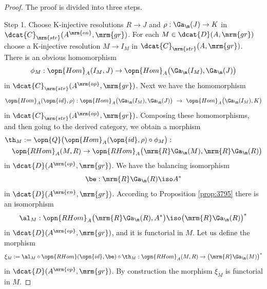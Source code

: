 \begin{proof} 
The proof is divided into three steps. 

\smallskip \noindent 
Step 1. Choose K-injective resolutions $R \to J$ and
$\rho : \Ga_{\m}(J) \to K$ in $\dcat{C}_{\mrm{str}}(A^{\mrm{en}}, \mrm{gr})$.
For each $M \in \dcat{D}(A, \mrm{gr})$ choose a K-injective resolution 
$M \to I_M$ in $\dcat{C}_{\mrm{str}}(A, \mrm{gr})$. 
There is an obvious homomorphism 
\[ \phi_M : \opn{Hom}_A(I_M, J) \to 
\opn{Hom}_A \bigl( \Ga_{\m}(I_M), \Ga_{\m}(J) \bigr)  \] 
in $\dcat{C}_{\mrm{str}}(A^{\mrm{op}}, \mrm{gr})$. 
Next we have the homomorphism 
\[ \opn{Hom}_A(\opn{id}, \rho) :  
\opn{Hom}_A \bigl( \Ga_{\m}(I_M), \Ga_{\m}(J) \bigr) \ \to \ 
\opn{Hom}_A \bigl( \Ga_{\m}(I_M), K \bigr) \] 
in $\dcat{C}_{\mrm{str}}(A^{\mrm{op}}, \mrm{gr})$. 
Composing these homomorphisms, and then going to the derived category, we 
obtain a morphism 
\begin{equation} \label{eqn:4835}
\begin{aligned}
& 
\th_M := \opn{Q} \bigl( \opn{Hom}_A(\opn{id}, \rho) \circ \phi_M \bigr) :
\\ & \quad 
\opn{RHom}_A(M, R) \to \opn{RHom}_A \bigl( \mrm{R} \Ga_{\m}(M), 
\mrm{R} \Ga_{\m}(R) \bigr)
\end{aligned}
\end{equation}
in $\dcat{D}(A^{\mrm{op}}, \mrm{gr})$. 
We have the balancing isomorphism 
\begin{equation} \label{eqn:4616}
\be : \mrm{R} \Ga_{\m}(R) \iso A^*
\end{equation}
in $\dcat{D}(A^{\mrm{en}}, \mrm{gr})$.
According to Proposition \ref{prop:3795} there is an isomorphism 
\[ \al_M : 
\opn{RHom}_A \bigl( \mrm{R} \Ga_{\m}(R), A^* \bigr) \iso 
\bigl( \mrm{R} \Ga_{\m}(R) \bigr)^* \]
in $\dcat{D}(A^{\mrm{op}}, \mrm{gr})$, and it is functorial in $M$.  
Let us define the morphism 
\begin{equation} \label{eqn:4615}
\xi_M :=  \al_M \circ \opn{RHom}(\opn{id}, \be) \circ \th_M :
\opn{RHom}_A(M, R) \to \bigl( \mrm{R} \Ga_{\m} (M) \bigr)^*
\end{equation}
in $\dcat{D}(A^{\mrm{op}}, \mrm{gr})$.
By construction the morphism $\xi_M$ is functorial in $M$. 


\end{proof}
